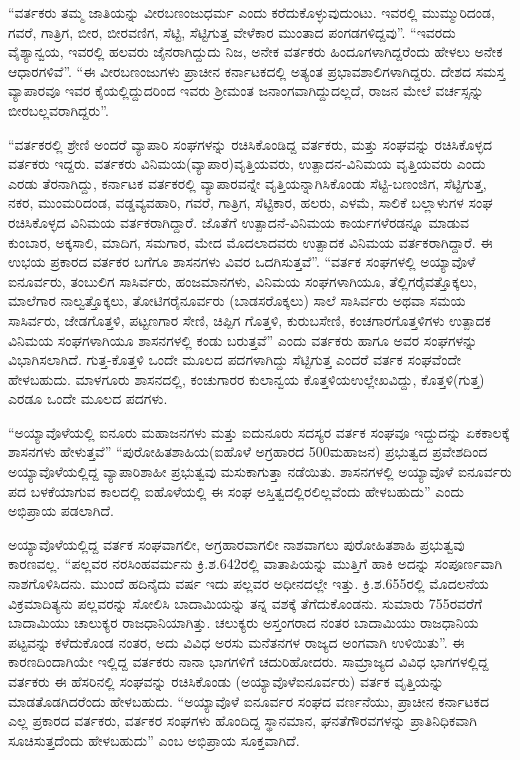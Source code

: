 “ವರ್ತಕರು ತಮ್ಮ ಜಾತಿಯನ್ನು ವೀರಬಣಂಜುಧರ್ಮ ಎಂದು ಕರೆದುಕೊಳ್ಳುವುದುಂಟು. ಇವರಲ್ಲಿ ಮುಮ್ಮುರಿದಂಡ, ಗವರೆ, ಗಾತ್ರಿಗ, ಬೀರ, ಬೀರವಣಿಗ, ಸೆಟ್ಟಿ, ಸೆಟ್ಟಿಗುತ್ತ ವೇಳೆಕಾರ ಮುಂತಾದ ಪಂಗಡಗಳಿದ್ದವು”. “ಇವರದು ವೈಶ್ಯಾನ್ವಯ, ಇವರಲ್ಲಿ ಹಲವರು ಜೈನರಾಗಿದ್ದುದು ನಿಜ, ಅನೇಕ ವರ್ತಕರು ಹಿಂದೂಗಳಾಗಿದ್ದರೆಂದು ಹೇಳಲು ಅನೇಕ ಆಧಾರಗಳಿವೆ”. “ಈ ವೀರಬಣಂಜುಗಳು ಪ್ರಾಚೀನ ಕರ್ನಾಟಕದಲ್ಲಿ ಅತ್ಯಂತ ಪ್ರಭಾವಶಾಲಿಗಳಾಗಿದ್ದರು. ದೇಶದ ಸಮಸ್ತ ವ್ಯಾಪಾರವೂ ಇವರ ಕೈಯಲ್ಲಿದ್ದುದರಿಂದ ಇವರು ಶ‍್ರೀಮಂತ ಜನಾಂಗವಾಗಿದ್ದುದಲ್ಲದೆ, ರಾಜನ ಮೇಲೆ ವರ್ಚಸ್ಸನ್ನು ಬೀರಬಲ್ಲವರಾಗಿದ್ದರು”.

“ವರ್ತಕರಲ್ಲಿ ಶ್ರೇಣಿ ಅಂದರೆ ವ್ಯಾಪಾರಿ ಸಂಘಗಳನ್ನು ರಚಿಸಿಕೊಂಡಿದ್ದ ವರ್ತಕರು, ಮತ್ತು ಸಂಘವನ್ನು ರಚಿಸಿಕೊಳ್ಳದ ವರ್ತಕರು ಇದ್ದರು. ವರ್ತಕರು ವಿನಿಮಯ(ವ್ಯಾಪಾರ)ವೃತ್ತಿಯವರು, ಉತ್ಪಾದನ-ವಿನಿಮಯ ವೃತ್ತಿಯವರು ಎಂದು ಎರಡು ತೆರನಾಗಿದ್ದು, ಕರ್ನಾಟಕ ವರ್ತಕರಲ್ಲಿ ವ್ಯಾಪಾರವನ್ನೇ ವೃತ್ತಿಯನ್ನಾಗಿಸಿಕೊಂಡು ಸೆಟ್ಟಿ-ಬಣಂಜಿಗ, ಸೆಟ್ಟಿಗುತ್ತ, ನಕರ, ಮುಂಮರಿದಂಡ, ವಡ್ಡವ್ಯವಹಾರಿ, ಗವರೆ, ಗಾತ್ರಿಗ, ಸೆಟ್ಟಿಕಾರ, ಹಲರು, ಎಳಮೆ, ಸಾಲಿಕೆ ಬಲ್ಲಾಳುಗಳ ಸಂಘ ರಚಿಸಿಕೊಳ್ಳದ ವಿನಿಮಯ ವರ್ತಕರಾಗಿದ್ದಾರೆ. ಜೊತೆಗೆ ಉತ್ಪಾದನೆ-ವಿನಿಮಯ ಕಾರ್ಯಗಳೆರಡನ್ನೂ ಮಾಡುವ ಕುಂಬಾರ, ಅಕ್ಕಸಾಲಿ, ಮಾದಿಗ, ಸಮಗಾರ, ಮೇದ ಮೊದಲಾದವರು ಉತ್ಪಾದಕ ವಿನಿಮಯ ವರ್ತಕರಾಗಿದ್ದಾರೆ. ಈ ಉಭಯ ಪ್ರಕಾರದ ವರ್ತಕರ ಬಗೆಗೂ ಶಾಸನಗಳು ವಿವರ ಒದಗಿಸುತ್ತವೆ”. “ವರ್ತಕ ಸಂಘಗಳಲ್ಲಿ ಅಯ್ಯಾವೊಳೆ ಐನೂರ್ವರು, ತಂಬುಲಿಗ ಸಾಸಿರ್ವರು, ಹಂಜಮಾನಗಳು, ವಿನಿಮಯ ಸಂಘಗಳಾಗಿಯೂ, ತೆಲ್ಲಿಗರೈವತ್ತೊಕ್ಕಲು, ಮಾಲೆಗಾರ ನಾಲ್ವತ್ತೊಕ್ಕಲು, ತೋಟಿಗರೈನೂರ್ವರು (ಬಾಡಸರೊಕ್ಕಲು) ಸಾಲೆ ಸಾಸಿರ್ವರು ಅಥವಾ ಸಮಯ ಸಾಸಿರ್ವರು, ಜೇಡಗೊತ್ತಳಿ, ಪಟ್ಟಣಗಾರ ಸೇಣಿ, ಚಿಪ್ಪಿಗ ಗೊತ್ತಳಿ, ಕುರುಬಸೇಣಿ, ಕಂಚಗಾರಗೊತ್ತಳಿಗಳು ಉತ್ಪಾದಕ ವಿನಿಮಯ ಸಂಘಗಳಾಗಿಯೂ ಶಾಸನಗಳಲ್ಲಿ ಕಂಡು ಬರುತ್ತವೆ” ಎಂದು ವರ್ತಕರು ಹಾಗೂ ಅವರ ಸಂಘಗಳನ್ನು ವಿಭಾಗಿಸಲಾಗಿದೆ. ಗುತ್ತ-ಕೊತ್ತಳಿ ಒಂದೇ ಮೂಲದ ಪದಗಳಾಗಿದ್ದು ಸೆಟ್ಟಿಗುತ್ತ ಎಂದರೆ ವರ್ತಕ ಸಂಘವೆಂದೇ ಹೇಳಬಹುದು. ಮಾಳಗೂರು ಶಾಸನದಲ್ಲಿ, ಕಂಚುಗಾರರ ಕುಲಾನ್ವಯ ಕೊತ್ತಳಿಯಉಲ್ಲೇಖವಿದ್ದು, ಕೊತ್ತಳಿ(ಗುತ್ತ) ಎರಡೂ ಒಂದೇ ಮೂಲದ ಪದಗಳು.

“ಅಯ್ಯಾವೊಳೆಯಲ್ಲಿ ಐನೂರು ಮಹಾಜನಗಳು ಮತ್ತು ಐದುನೂರು ಸದಸ್ಯರ ವರ್ತಕ ಸಂಘವೂ ಇದ್ದುದನ್ನು ಏಕಕಾಲಕ್ಕೆ ಶಾಸನಗಳು ಹೇಳುತ್ತವೆ” “ಪುರೋಹಿತಶಾಹಿಯ(ಐಹೊಳೆ ಅಗ್ರಹಾರದ 500ಮಹಾಜನ) ಪ್ರಭುತ್ವದ ಪ್ರವೇಶದಿಂದ ಅಯ್ಯಾವೊಳೆಯಲ್ಲಿದ್ದ ವ್ಯಾಪಾರಿಶಾಹೀ ಪ್ರಭುತ್ವವು ಮಸುಕಾಗುತ್ತಾ ನಡೆಯಿತು. ಶಾಸನಗಳಲ್ಲಿ ಅಯ್ಯಾವೊಳೆ ಐನೂರ್ವರು ಪದ ಬಳಕೆಯಾಗುವ ಕಾಲದಲ್ಲಿ ಐಹೊಳೆಯಲ್ಲಿ ಈ ಸಂಘ ಅಸ್ತಿತ್ವದಲ್ಲಿರಲಿಲ್ಲವೆಂದು ಹೇಳಬಹುದು” ಎಂದು ಅಭಿಪ್ರಾಯ ಪಡಲಾಗಿದೆ.

ಅಯ್ಯಾವೊಳೆಯಲ್ಲಿದ್ದ ವರ್ತಕ ಸಂಘವಾಗಲೀ, ಅಗ್ರಹಾರವಾಗಲೀ ನಾಶವಾಗಲು ಪುರೋಹಿತಶಾಹಿ ಪ್ರಭುತ್ವವು ಕಾರಣವಲ್ಲ. “ಪಲ್ಲವರ ನರಸಿಂಹವರ್ಮನು ಕ್ರಿ.ಶ.642ರಲ್ಲಿ ವಾತಾಪಿಯನ್ನು ಮುತ್ತಿಗೆ ಹಾಕಿ ಅದನ್ನು ಸಂಪೂರ್ಣವಾಗಿ ನಾಶಗೊಳಿಸಿದನು. ಮುಂದೆ ಹದಿನೈದು ವರ್ಷ ಇದು ಪಲ್ಲವರ ಅಧೀನದಲ್ಲೇ ಇತ್ತು. ಕ್ರಿ.ಶ.655ರಲ್ಲಿ ಮೊದಲನೆಯ ವಿಕ್ರಮಾದಿತ್ಯನು ಪಲ್ಲವರನ್ನು ಸೋಲಿಸಿ ಬಾದಾಮಿಯನ್ನು ತನ್ನ ವಶಕ್ಕೆ ತೆಗೆದುಕೊಂಡನು. ಸುಮಾರು 755ರವರೆಗೆ ಬಾದಾಮಿಯು ಚಾಲುಕ್ಯರ ರಾಜಧಾನಿಯಾಗಿತ್ತು. ಚಲುಕ್ಯರು ಅಸ್ತಂಗರಾದ ನಂತರ ಬಾದಾಮಿಯು ರಾಜಧಾನಿಯ ಪಟ್ಟವನ್ನು ಕಳೆದುಕೊಂಡ ನಂತರ, ಅದು ವಿವಿಧ ಅರಸು ಮನೆತನಗಳ ರಾಜ್ಯದ ಅಂಗವಾಗಿ ಉಳಿಯಿತು”. ಈ ಕಾರಣದಿಂದಾಗಿಯೇ ಇಲ್ಲಿದ್ದ ವರ್ತಕರು ನಾನಾ ಭಾಗಗಳಿಗೆ ಚದುರಿಹೋದರು. ಸಾಮ್ರಾಜ್ಯದ ವಿವಿಧ ಭಾಗಗಳಲ್ಲಿದ್ದ ವರ್ತಕರು ಈ ಹೆಸರಿನಲ್ಲಿ ಸಂಘವನ್ನು ರಚಿಸಿಕೊಂಡು (ಅಯ್ಯಾವೊಳೆಐನೂರ್ವರು) ವರ್ತಕ ವೃತ್ತಿಯನ್ನು ಮಾಡತೊಡಗಿದರೆಂದು ಹೇಳಬಹುದು. “ಅಯ್ಯಾವೊಳೆ ಐನೂರ್ವರ ಸಂಘದ ವರ್ಣನೆಯು, ಪ್ರಾಚೀನ ಕರ್ನಾಟಕದ ಎಲ್ಲ ಪ್ರಕಾರದ ವರ್ತಕರು, ವರ್ತಕರ ಸಂಘಗಳು ಹೊಂದಿದ್ದ ಸ್ಥಾನಮಾನ, ಘನತೆಗೌರವಗಳನ್ನು ಪ್ರಾತಿನಿಧಿಕವಾಗಿ ಸೂಚಿಸುತ್ತದೆಂದು ಹೇಳಬಹುದು” ಎಂಬ ಅಭಿಪ್ರಾಯ ಸೂಕ್ತವಾಗಿದೆ.

